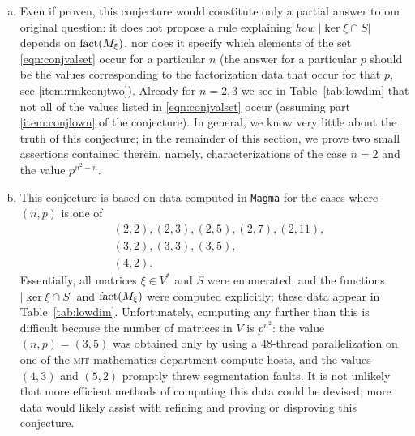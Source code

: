 \begin{rem}
\label{rem:conj}
\begin{enumerate}[(a)]
\item Even if proven, this conjecture would constitute only a partial answer to our original question: it does not propose a rule explaining \emph{how} $|\ker\xi\cap S|$ depends on $\operatorname{fact}(M_\xi)$, nor does it specify which elements of the set \eqref{eqn:conjvalset} occur for a particular $n$ (the answer for a particular $p$ should be the values corresponding to the factorization data that occur for that $p$, see \eqref{item:rmkconjtwo}). Already for $n=2,3$ we see in Table~\ref{tab:lowdim} that not all of the values listed in \eqref{eqn:conjvalset} occur (assuming part \eqref{item:conjlown} of the conjecture). In general, we know very little about the truth of this conjecture; in the remainder of this section, we prove two small assertions contained therein, namely, characterizations of the case $n=2$ and the value $p^{n^2-n}$.
\item This conjecture is based on data computed in \texttt{Magma} \cite{magma} for the cases where $(n,p)$ is one of
\begin{align*}
&(2,2),(2,3),(2,5),(2,7),(2,11),\\
&(3,2),(3,3),(3,5),\\
&(4,2).
\end{align*}
Essentially, all matrices $\xi\in V^*$ and $S$ were enumerated, and the functions $|\ker\xi\cap S|$ and $\operatorname{fact}(M_\xi)$ were computed explicitly; these data appear in Table~\ref{tab:lowdim}. Unfortunately, computing any further than this is difficult because the number of matrices in $V$ is $p^{n^2}$: the value $(n,p)=(3,5)$ was obtained only by using a $48$-thread parallelization on one of the \textsc{mit} mathematics department compute hosts, and the values $(4,3)$ and $(5,2)$ promptly threw segmentation faults. It is not unlikely that more efficient methods of computing this data could be devised; more data would likely assist with refining and proving or disproving this conjecture.\label{item:rmkconjone}


\end{enumerate}
\end{rem}
